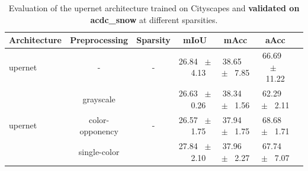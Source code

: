 \begin{table}[h]
  \centering
  \caption{Evaluation of the upernet architecture trained on Cityscapes and \textbf{validated on acdc_snow} at different sparsities.}
  \begin{tabular}{@{}lccc ccc@{}}
    \toprule
    Architecture & Preprocessing & Sparsity & mIoU & mAcc & aAcc \\
    \midrule
    upernet & - & - & 26.84 ~$\pm$~ 4.13 & 38.65 ~$\pm$~ 7.85 & 66.69 ~$\pm$~ 11.22 \\
    \midrule
    \midrule
    \multirow{3}{*}{upernet} & grayscale & \multirow{3}{*}{-} & 26.63 ~$\pm$~ 0.26 & 38.34 ~$\pm$~ 1.56 & 62.29 ~$\pm$~ 2.11 \\
    & color-opponency & & 26.57 ~$\pm$~ 1.75 & 37.94 ~$\pm$~ 1.75 & 68.68 ~$\pm$~ 1.71 \\
    & single-color & & 27.84 ~$\pm$~ 2.10 & 37.96 ~$\pm$~ 2.27 & 67.74 ~$\pm$~ 7.07 \\
    \midrule
    \bottomrule
  \end{tabular}
  \label{tab:sparse_upernet_acdc_snow}
\end{table}